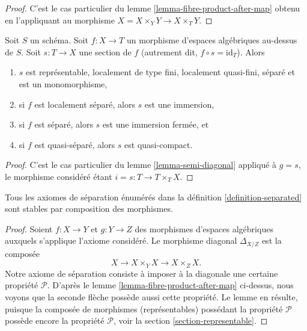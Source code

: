 \begin{proof}
C'est le cas particulier du lemme \ref{lemma-fibre-product-after-map}
obtenu en l'appliquant au morphisme $X = X \times_Y Y \to X \times_T Y$.
\end{proof}

\begin{lemma}
\label{lemma-section-immersion}
Soit $S$ un schéma.
Soit $f : X \to T$ un morphisme d'espaces algébriques au-dessus de $S$.
Soit $s : T \to X$ une section de $f$ (autrement dit,
$f \circ s = \text{id}_T$). Alors
\begin{enumerate}
\item $s$ est représentable, localement de type fini, localement quasi-fini,
séparé et est un monomorphisme,
\item si $f$ est localement séparé, alors $s$ est une immersion,
\item si $f$ est séparé, alors $s$ est une immersion fermée, et
\item si $f$ est quasi-séparé, alors $s$ est quasi-compact.
\end{enumerate}
\end{lemma}

\begin{proof}
C'est le cas particulier du lemme \ref{lemma-semi-diagonal} appliqué à
$g = s$, le morphisme considéré étant $i = s : T \to T \times_T X$.
\end{proof}

\begin{lemma}
\label{lemma-composition-separated}
Tous les axiomes de séparation énumérés dans la définition \ref{definition-separated}
sont stables par composition des morphismes.
\end{lemma}

\begin{proof}
Soient $f : X \to Y$ et $g : Y \to Z$ des morphismes d'espaces algébriques
auxquels s'applique l'axiome considéré.
Le morphisme diagonal $\Delta_{X/Z}$ est la composée
$$
X \longrightarrow X \times_Y X \longrightarrow X \times_Z X.
$$
Notre axiome de séparation consiste à imposer à la diagonale
une certaine propriété $\mathcal{P}$. D'après le
lemme \ref{lemma-fibre-product-after-map} ci-dessus, nous voyons que
la seconde flèche possède aussi cette propriété. Le lemme en résulte,
puisque la composée de morphismes (représentables) possédant la propriété
$\mathcal{P}$ possède encore la propriété $\mathcal{P}$, voir
la section \ref{section-representable}.
\end{proof}

